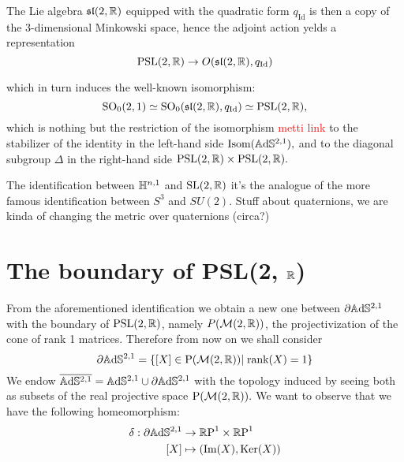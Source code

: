 \begin{observation}
    The Lie algebra $\mathfrak{sl}(2,\mathbb{R})$ equipped with the quadratic form $q_{\text{Id}}$ is then a copy of the 3-dimensional Minkowski space, hence the adjoint action yelds a representation 
    \[
        \text{PSL}(2,\mathbb{R})\to O(\mathfrak{sl}(2,\mathbb{R}),q_{\text{Id}})
    \]

which in turn induces the well-known isomorphism: 
\[
    \text{SO}_0(2,1)\simeq\text{SO}_0(\mathfrak{sl}(2,\mathbb{R}), q_\text{Id})\simeq \text{PSL}(2,\mathbb{R}),
\] which is nothing but the restriction of the isomorphism \textcolor{red}{metti link} to the stabilizer of the identity in the left-hand side $\text{Isom}(\mathbb{A}\mathrm{d}\mathbb{S}^{2,1}),$ and to the diagonal subgroup $\Delta$ in the right-hand side $\text{PSL}(2,\mathbb{R})\times\text{PSL}(2,\mathbb{R}).$
\end{observation}

\begin{observation}
    The identification between $\mathbb{H}^{n,1}$ and $\text{SL}(2,\mathbb{R})$ it's the analogue of the more famous identification between $S^3$ and $SU(2)$. Stuff about quaternions, we are kinda of changing the metric over quaternions (circa?)
\end{observation}

\section{The boundary of PSL(2, $\mathbb{R}$)} 
From the aforementioned identification we obtain a new one between $\partial\mathbb{A}\mathrm{d}\mathbb{S}^{2,1}$ with the boundary of $\text{PSL}(2,\mathbb{R})$, namely $P(\mathcal{M}(2,\mathbb{R}))$, the projectivization of the cone of rank 1 matrices. Therefore from now on we shall consider 
\[
    \partial\mathbb{A}\mathrm{d}\mathbb{S}^{2,1}=\{[X]\in\text{P}(\mathcal{M}(2,\mathbb{R}))|\;\text{rank}(X)=1\}
\]
We endow $\overline{\mathbb{A}\mathrm{d}\mathbb{S}^{2,1}}=\mathbb{A}\mathrm{d}\mathbb{S}^{2,1}\cup\partial\mathbb{A}\mathrm{d}\mathbb{S}^{2,1}$ with the topology induced by seeing both as subsets of the real projective space $\text{P}(\mathcal{M}(2,\mathbb{R})).$ We want to observe that we have the following homeomorphism: 
\begin{align*}\label{delta}
    \delta:\partial\mathbb{A}\mathrm{d}\mathbb{S}^{2,1}&\rightarrow\mathbb{R}\text{P}^1\times\mathbb{R}\text{P}^1\\
    [X]&\mapsto (\text{Im}(X),\text{Ker}(X))
\end{align*}


